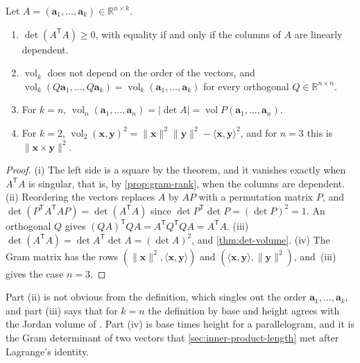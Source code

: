 \begin{corollary}
\label{cor:k-volume}
Let $A=(\mathbf a_1,\ldots,\mathbf a_k)\in\mathbb R^{n\times k}$.
\begin{enumerate}
\item $\det(A^{\mathsf T}A)\ge0$, with equality if and only if the columns of $A$ are linearly dependent.
\item $\operatorname{vol}_k$ does not depend on the order of the vectors, and $\operatorname{vol}_k(Q\mathbf a_1,\ldots,Q\mathbf a_k)=\operatorname{vol}_k(\mathbf a_1,\ldots,\mathbf a_k)$ for every orthogonal $Q\in\mathbb R^{n\times n}$.
\item For $k=n$, $\operatorname{vol}_n(\mathbf a_1,\ldots,\mathbf a_n)=|\det A|=\operatorname{vol}P(\mathbf a_1,\ldots,\mathbf a_n)$.
\item For $k=2$, $\operatorname{vol}_2(\mathbf x,\mathbf y)^2=\|\mathbf x\|^2\|\mathbf y\|^2-\langle\mathbf x,\mathbf y\rangle^2$, and for $n=3$ this is $\|\mathbf x\times\mathbf y\|^2$.
\end{enumerate}
\end{corollary}

\begin{proof}
(i) The left side is a square by the theorem, and it vanishes exactly when $A^{\mathsf T}A$ is singular, that is, by \cref{prop:gram-rank}, when the columns are dependent. (ii) Reordering the vectors replaces $A$ by $AP$ with a permutation matrix $P$, and $\det(P^{\mathsf T}A^{\mathsf T}AP)=\det(A^{\mathsf T}A)$ since $\det P^{\mathsf T}\det P=(\det P)^2=1$. An orthogonal $Q$ gives $(QA)^{\mathsf T}QA=A^{\mathsf T}Q^{\mathsf T}QA=A^{\mathsf T}A$. (iii) $\det(A^{\mathsf T}A)=\det A^{\mathsf T}\det A=(\det A)^2$, and \cref{thm:det-volume}. (iv) The Gram matrix has the rows $(\|\mathbf x\|^2,\langle\mathbf x,\mathbf y\rangle)$ and $(\langle\mathbf x,\mathbf y\rangle,\|\mathbf y\|^2)$, and \,(iii) gives the case $n=3$.
\end{proof}

Part (ii) is not obvious from the definition, which singles out the order $\mathbf a_1,\ldots,\mathbf a_k$, and part (iii) says that for $k=n$ the definition by base and height agrees with the Jordan volume of . Part (iv) is base times height for a parallelogram, and it is the Gram determinant of two vectors that \cref{sec:inner-product-length} met after Lagrange's identity.

